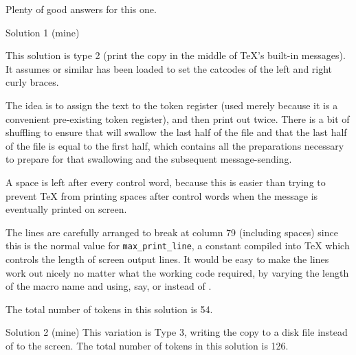 

Plenty of good answers for this one.

\begin{solution}{Solution 1 (mine)}

    This solution is type 2 (print the copy in the middle of TeX's
    built-in messages). It assumes  or similar has been
    loaded to set the catcodes of the left and right curly braces.

    The idea is to assign the text to the token register \cmd{\errhelp}
    (used merely because it is a convenient pre-existing token
    register), and then print out \cmd{\the}\cmd{\errhelp} twice. There is a bit
    of shuffling to ensure that \cmd{\errhelp} will swallow the last half of
    the file and that the last half of the file is equal to the first
    half, which contains all the preparations necessary to prepare
    \cmd{\errhelp} for that swallowing and the subsequent message-sending.

    A space is left after every control word, because this is easier
    than trying to prevent TeX from printing spaces after control
    words when the message is eventually printed on screen.

    The lines are carefully arranged to break at column 79
    (including spaces) since this is the normal value for \verb?max_print_line?,
    a constant compiled into TeX which controls the length of screen
    output lines. It would be easy to make the lines work out nicely
    no matter what the working code required, by varying the length
    of the macro name \cmd{\selfcopy} and using, say, \cmd{\everyhbox} or
    \cmd{\everyjob} instead of \cmd{\errhelp}.

    The total number of tokens in this solution is 54.

\begin{lcode}
{\gdef \selfcopy {\message {{\the \errhelp }}\message {{\the \errhelp }}\end }
\aftergroup \errhelp \afterassignment \selfcopy }
{\gdef \selfcopy {\message {{\the \errhelp }}\message {{\the \errhelp }}\end }
\aftergroup \errhelp \afterassignment \selfcopy }
\end{lcode}
\end{solution}

\begin{solution}{Solution 2 (mine)} 
This variation is Type 3, writing the copy to a disk file
instead of to the screen. The total number of tokens in this
solution is 126.
\end{solution}

